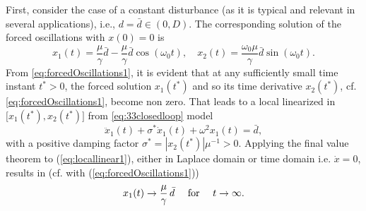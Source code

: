 \documentclass[letterpaper, 10 pt, conference]{ieeeconf}  %
\begin{document}
First, consider the case of a constant disturbance
(as it is typical and relevant in several applications), i.e., $d=\bar{d}\in(0,D)$.
The corresponding solution of the forced oscillations with $x(0)=0$
is 
\begin{equation}\label{eq:forcedOscillations1}
x_{1}(t) = \frac{\mu}{\gamma}\bar{d}-\frac{\mu}{\gamma}\bar{d}\cos(\omega_{0}t), \quad x_{2}(t) = \frac{\omega_0 \mu }{\gamma}\bar{d}\sin(\omega_{0}t).
\end{equation}
From \eqref{eq:forcedOscillations1}, it is evident
that at any sufficiently small time instant
$t^{\ast}>0$, the forced solution $x_{1}(t^{\ast})$ and so its time
derivative $x_{2}(t^{\ast})$, cf. \eqref{eq:forcedOscillations1}, become non zero. That leads to a local linearized in $\bigl[x_1(t^{\ast}),x_2(t^{\ast})\bigr]$ from \eqref{eq:33closedloop} model
\begin{equation}
\ddot{x}_{1}(t)+\sigma^{\ast}\dot{x}_{1}(t)+\omega^{2}x_{1}(t)=\bar{d},\label{eq:locallinear1}
\end{equation}
with a positive damping factor $\sigma^{\ast}=|x_{2}(t^{\ast})|\mu^{-1} > 0$.
Applying the final value theorem to (\ref{eq:locallinear1}), either
in Laplace domain or time domain i.e. $\dot{x}=0$, results in (cf.
with (\ref{eq:forcedOscillations1})) 
\begin{equation}
x_{1}(t)\rightarrow\frac{\mu}{\gamma}\,\bar{d}\quad\hbox{ for }\quad t\rightarrow\infty.\label{eq:errorBoundConst}
\end{equation}
\end{document}
